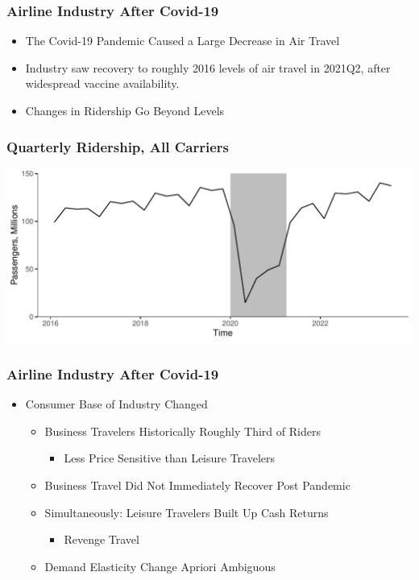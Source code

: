 \documentclass[xcolor=dvipsnames]{beamer}
\begin{document}
    \begin{frame}
        \frametitle{Airline Industry After Covid-19}
        \begin{itemize}
            \item The Covid-19 Pandemic Caused a Large Decrease in Air Travel
            \item Industry saw recovery to roughly 2016 levels of air travel in 2021Q2, after widespread vaccine availability.
            \item Changes in Ridership Go Beyond Levels
        \end{itemize}
    \end{frame}

    \begin{frame}
        \frametitle{Quarterly Ridership, All Carriers}
        \includegraphics[width = \linewidth]{Quarterly_DB1B_Itineraries}
    \end{frame}


    \begin{frame}
        \frametitle{Airline Industry After Covid-19}
        \begin{itemize}
         \item Consumer Base of Industry Changed
            \begin{itemize}
                \item Business Travelers Historically Roughly Third of Riders
                \begin{itemize}
                    \item Less Price Sensitive than Leisure Travelers
                \end{itemize}
                \item Business Travel Did Not Immediately Recover Post Pandemic
                \item Simultaneously: Leisure Travelers Built Up Cash Returns
                \begin{itemize}
                    \item Revenge Travel
                \end{itemize}
                \item Demand Elasticity Change Apriori Ambiguous
            \end{itemize}
        \end{itemize}
    \end{frame}
\end{document}
